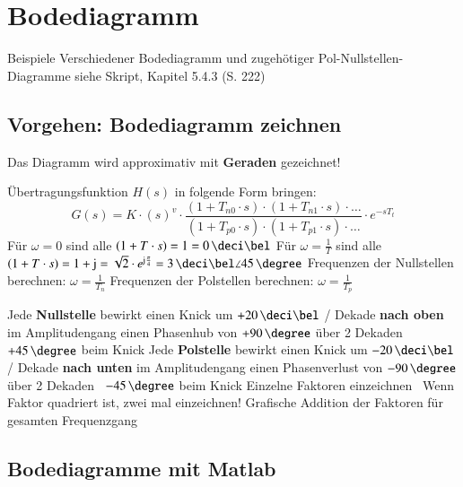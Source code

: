 \section{Bodediagramm}

Beispiele Verschiedener Bodediagramm und zugehötiger Pol-Nullstellen-Diagramme siehe Skript, Kapitel 5.4.3 (S. 222)


\subsection{Vorgehen: Bodediagramm zeichnen}

Das Diagramm wird approximativ mit \textbf{Geraden} gezeichnet!

\begin{outline}
    \1 Übertragungsfunktion $H(s)$ in folgende Form bringen:
        $$ G(s) = K \cdot (s)^v \cdot \frac{(1 + T_{n0} \cdot s)\cdot (1 + T_{n1} \cdot s) \cdot \ldots}
        {(1 + T_{p0} \cdot s)\cdot (1 + T_{p1} \cdot s) \cdot \ldots} \cdot e^{- s T_t} $$
        \2 Für $\omega = 0$ sind alle $(1 + T \cdot s) = 1 = 0 \, \deci \bel$
        \2 Für $\omega = \frac{1}{T}$ sind alle  $(1 + T \cdot s) = 1 + \jimg = \sqrt{2} \cdot e^{\jimg \frac{\pi}{4}} 
            = 3 \, \deci \bel \angle 45 \, \degree$ %
    \1 Frequenzen der Nullstellen berechnen: $\omega = \frac{1}{T_n}$
    \1 Frequenzen der Polstellen berechnen: $\omega = \frac{1}{T_p}$

    \1 Jede \textbf{Nullstelle} bewirkt
        \2 einen Knick um $+ 20 \, \deci \bel$ / Dekade \textbf{nach oben} im Amplitudengang
        \2 einen Phasenhub von $+ 90 \, \degree$ über 2 Dekaden \textrightarrow\ $+ 45 \, \degree$ beim Knick
    \1 Jede \textbf{Polstelle} bewirkt
        \2 einen Knick um $- 20 \, \deci \bel$ / Dekade \textbf{nach unten} im Amplitudengang
        \2 einen Phasenverlust von $- 90 \, \degree$ über 2 Dekaden \textrightarrow\ $- 45 \, \degree$ beim Knick
    \1 Einzelne Faktoren einzeichnen \textrightarrow\ Wenn Faktor quadriert ist, zwei mal einzeichnen!
    \1 Grafische Addition der Faktoren für gesamten Frequenzgang
\end{outline}



\subsection{Bodediagramme mit Matlab}


